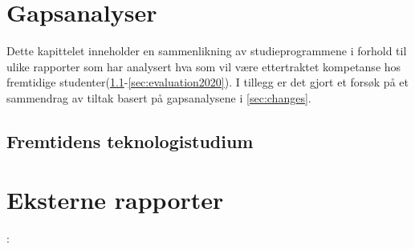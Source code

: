 \documentclass[a4paper, oneside, 12pt]{memoir}
\begin{document}

\chapter{Gapsanalyser}
\label{chap:gap-analysis}

Dette kapittelet inneholder en sammenlikning av studieprogrammene i forhold til ulike rapporter som har analysert hva som vil være ettertraktet kompetanse hos fremtidige studenter(\ref{sec:fts}-\ref{sec:evaluation2020}). I tillegg er det gjort et forsøk på et sammendrag av tiltak basert på gapsanalysene i \ref{sec:changes}.



\section{Fremtidens teknologistudium}
	\label{sec:fts}
	
	



\chapter{Eksterne rapporter}
\label{chap:external-reports}



:






\printbibliography





\end{document}
